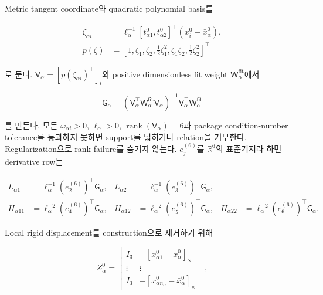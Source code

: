 \documentclass[11pt,a4paper]{article}
\newcommand{\R}{\mathbb{R}}
\begin{document}
Metric tangent coordinate와 quadratic polynomial basis를

\begin{equation}
\begin{aligned}
  \zeta_{\alpha i}
  &=\ell_\alpha^{-1}
  [t_{\alpha1}^0,t_{\alpha2}^0]^\top
  (x_i^0-\bar x_\alpha^0),\\
  p(\zeta)
  &=
  [1,\zeta_1,\zeta_2,
    \tfrac12\zeta_1^2,\zeta_1\zeta_2,
    \tfrac12\zeta_2^2]^\top
\end{aligned}
\end{equation}

로 둔다. \(\mathsf V_\alpha=[p(\zeta_{\alpha i})^\top]_i\)와
positive dimensionless fit weight \(\mathsf W_\alpha^{\mathrm{fit}}\)에서

\begin{equation}
  \mathsf G_\alpha
  =
  (\mathsf V_\alpha^\top
   \mathsf W_\alpha^{\mathrm{fit}}\mathsf V_\alpha)^{-1}
  \mathsf V_\alpha^\top\mathsf W_\alpha^{\mathrm{fit}}
  \label{eq:relation-mls-map}
\end{equation}

를 만든다.
모든 \(\omega_{\alpha i}>0\), \(\ell_\alpha>0\),
\(\operatorname{rank}(\mathsf V_\alpha)=6\)과 package condition-number tolerance를
통과하지 못하면 support를 넓히거나 relation을 거부한다.
Regularization으로 rank failure를 숨기지 않는다.
\(e_j^{(6)}\)를 \(\R^6\)의 표준기저라 하면 derivative row는

\begin{equation}
\begin{aligned}
  L_{\alpha1}&=\ell_\alpha^{-1}(e_2^{(6)})^\top\mathsf G_\alpha,
  &L_{\alpha2}&=\ell_\alpha^{-1}(e_3^{(6)})^\top\mathsf G_\alpha,\\
  H_{\alpha11}&=\ell_\alpha^{-2}(e_4^{(6)})^\top\mathsf G_\alpha,
  &H_{\alpha12}&=\ell_\alpha^{-2}(e_5^{(6)})^\top\mathsf G_\alpha,
  &H_{\alpha22}&=\ell_\alpha^{-2}(e_6^{(6)})^\top\mathsf G_\alpha .
\end{aligned}
\end{equation}

Local rigid displacement를 construction으로 제거하기 위해

\begin{equation}
  Z_\alpha^0
  =
  \begin{bmatrix}
    I_3&-[x_{\alpha1}^0-\bar x_\alpha^0]_\times\\
    \vdots&\vdots\\
    I_3&-[x_{\alpha n_\alpha}^0-\bar x_\alpha^0]_\times
  \end{bmatrix},
\end{equation}
\end{document}
